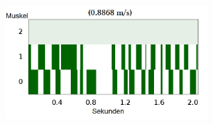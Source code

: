 \documentclass{beamer}
\begin{document}
\begin{frame}
\begin{columns}
\begin{figure}
		\end{figure}
		\begin{figure}
			\includegraphics[width=0.9\textwidth]{img/hum11.png}
		\end{figure}
	\end{columns}
\end{frame}
\end{document}
